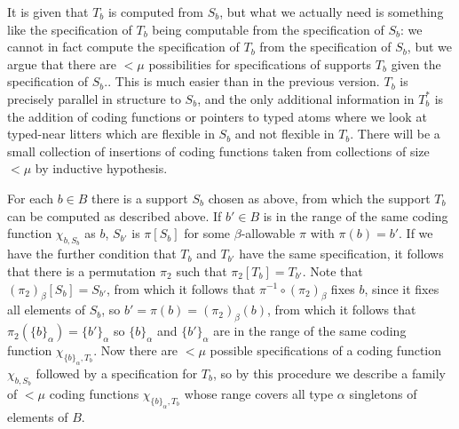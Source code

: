 \documentclass[112pt]{article}
\begin{document}
\begin{description}
It is given that $T_b$ is computed from
$S_b$, but what we actually need is something like the specification of $T_b$ being computable from the specification of $S_b$:  we cannot in fact compute the specification of $T_b$ from the specification of $S_b$, but we argue that there are $<\mu$ possibilities for specifications of supports $T_b$ given the specification of $S_b$..   This is much easier than in the previous version.
$T_b$ is precisely parallel in structure to $S_b$, and the only additional information in $T_b^*$  is the addition of coding functions or pointers to typed atoms where we look at typed-near litters which are flexible in $S_b$ and not flexible in $T_b$.  There will be a small collection of insertions of coding functions taken from collections of size $<\mu$ by inductive hypothesis.



For each $b \in B$ there is a support $S_b$ chosen as above, from which the support $T_b$ can be computed as described above.  If $b' \in B$ is in the range of the same coding function $\chi_{b,S_b}$ as $b$, $S_{b'}$ is $\pi[S_{b}]$ for some $\beta$-allowable $\pi$ with $\pi(b) = b'$.
If we have the further condition that $T_b$ and $T_{b'}$ have the same specification, it follows that there is a permutation $\pi_2$ such that $\pi_2[T_b] = T_{b'}$.  Note that $(\pi_2)_\beta[S_b]=S_{b'}$, from which it follows that $\pi^{-1} \circ (\pi_2)_\beta$ fixes $b$, since it fixes all elements of $S_b$, so $b'=\pi(b) = (\pi_2)_\beta(b)$, from which it follows
that $\pi_2(\{b\}_\alpha) = \{b'\}_\alpha$ so $\{b\}_\alpha$ and $\{b'\}_\alpha$ are in the range of the same coding function $\chi_{\{b\}_\alpha,T_b}$.  Now there are $<\mu$ possible specifications of a coding function $\chi_{b,S_b}$ followed by a specification for $T_b$, so by this procedure we describe a family of $<\mu$ coding functions $\chi_{\{b\}_\alpha,T_b}$ whose range covers all type $\alpha$ singletons of elements of $B$.

 



\begin{comment}


\end{comment}
\end{description}
\end{document}
